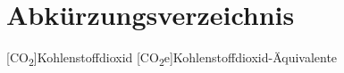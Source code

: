 \chapter*{Abkürzungsverzeichnis}

\begin{acronym}[WYSISWG] %

	
	[CO\textsubscript{2}]{Kohlenstoffdioxid}
	[CO\textsubscript{2}e]{Kohlenstoffdioxid-Äquivalente}

	

\end{acronym}